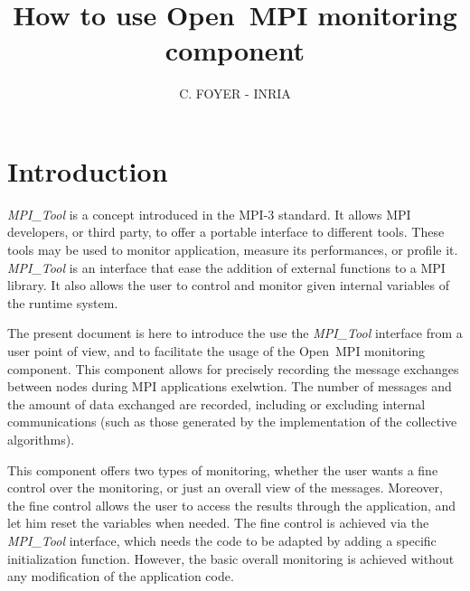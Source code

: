 %
%


\usepackage[english]{babel}
\usepackage[utf8]{inputenc}
\usepackage[T1]{fontenc}
\usepackage[a4paper]{geometry}
\usepackage{verbatim}
\usepackage{dirtree}

\title{How to use Open~MPI monitoring component}

\author{C. FOYER - INRIA}

\newcommand{\mpit}[1]{\textit{MPI\_Tool#1}}
\newcommand{\ompi}[0]{Open~MPI}
\newcommand{\brkunds}[0]{\allowbreak\_}



\maketitle

\section{Introduction}

\mpit{} is a concept introduced in the MPI-3 standard. It allows MPI
developers, or third party, to offer a portable interface to different
tools. These tools may be used to monitor application, measure its
performances, or profile it. \mpit{} is an interface that ease the
addition of external functions to a MPI library. It also allows the
user to control and monitor given internal variables of the runtime
system.

The present document is here to introduce the use the \mpit{}
interface from a user point of view, and to facilitate the usage of
the \ompi{} monitoring component. This component allows for
precisely recording the message exchanges between nodes during MPI
applications exelwtion. The number of messages and the amount of data
exchanged are recorded, including or excluding internal communications
(such as those generated by the implementation of the collective
algorithms).

This component offers two types of monitoring, whether the user wants
a fine control over the monitoring, or just an overall view of the
messages. Moreover, the fine control allows the user to access the
results through the application, and let him reset the variables when
needed. The fine control is achieved via the \mpit{} interface, which
needs the code to be adapted by adding a specific initialization
function. However, the basic overall monitoring is achieved without
any modification of the application code.

